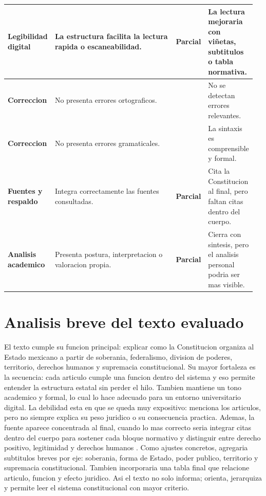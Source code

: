 \documentclass[12pt,letterpaper,oneside]{article}
\newcommand{\checkyes}{\textbf{\checkmark}}
\newcommand{\checkpartial}{\textbf{Parcial}}
\begin{document}
\begin{longtable}{@{}p{0.19\linewidth}p{0.49\linewidth}p{0.10\linewidth}p{0.18\linewidth}@{}}
\midrule
\textbf{Legibilidad digital} & La estructura facilita la lectura rapida o escaneabilidad. & \checkpartial & La lectura mejoraria con viñetas, subtitulos o tabla normativa. \\
\midrule
\textbf{Correccion} & No presenta errores ortograficos. & \checkyes & No se detectan errores relevantes. \\
\midrule
\textbf{Correccion} & No presenta errores gramaticales. & \checkyes & La sintaxis es comprensible y formal. \\
\midrule
\textbf{Fuentes y respaldo} & Integra correctamente las fuentes consultadas. & \checkpartial & Cita la Constitucion al final, pero faltan citas dentro del cuerpo. \\
\midrule
\textbf{Analisis academico} & Presenta postura, interpretacion o valoracion propia. & \checkpartial & Cierra con sintesis, pero el analisis personal podria ser mas visible. \\

\end{longtable}
\endgroup

\section{Analisis breve del texto evaluado}
El texto cumple su funcion principal: explicar como la Constitucion organiza al Estado mexicano a partir de soberania, federalismo, division de poderes, territorio, derechos humanos y supremacia constitucional. Su mayor fortaleza es la secuencia: cada articulo cumple una funcion dentro del sistema y eso permite entender la estructura estatal sin perder el hilo. Tambien mantiene un tono academico y formal, lo cual lo hace adecuado para un entorno universitario digital. La debilidad esta en que se queda muy expositivo: menciona los articulos, pero no siempre explica su peso juridico o su consecuencia practica. Ademas, la fuente aparece concentrada al final, cuando lo mas correcto seria integrar citas dentro del cuerpo para sostener cada bloque normativo y distinguir entre derecho positivo, legitimidad y derechos humanos \citep{finnis2017}. Como ajustes concretos, agregaria subtitulos breves por eje: soberania, forma de Estado, poder publico, territorio y supremacia constitucional. Tambien incorporaria una tabla final que relacione articulo, funcion y efecto juridico. Asi el texto no solo informa; orienta, jerarquiza y permite leer el sistema constitucional con mayor criterio.
\end{document}
